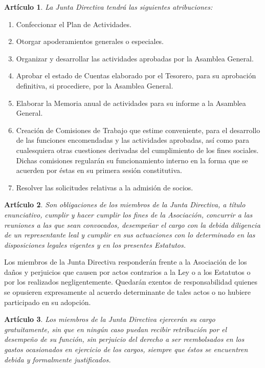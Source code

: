 \documentclass[a4paper,12pt]{article}
\theoremstyle{mystyle}		%
\newtheorem{art}{Artículo}	%
\begin{document}
\begin{onehalfspace}
\begin{art}
La Junta Directiva tendrá las siguientes atribuciones:
\end{art}
\begin{enumerate}[label={\alph*)}]
 \item Confeccionar el Plan de Actividades.
 \item Otorgar apoderamientos generales o especiales.
 \item Organizar y desarrollar las actividades aprobadas por la Asamblea General.
 \item Aprobar el estado de Cuentas elaborado por el Tesorero, para su aprobación definitiva, si procediere, por la Asamblea General.
 \item Elaborar la Memoria anual de actividades para su informe a la Asamblea General.
 \item Creación de Comisiones de Trabajo que estime conveniente, para el desarrollo de las funciones encomendadas y las actividades aprobadas, así como para cualesquiera otras cuestiones derivadas del cumplimiento de los fines sociales. Dichas comisiones regularán su funcionamiento interno en la forma que se acuerden por éstas en su primera sesión constitutiva.
 \item Resolver las solicitudes relativas a la admisión de socios.
\end{enumerate}

\begin{art}
Son obligaciones de los miembros de la Junta Directiva, a título enunciativo, cumplir y hacer cumplir los fines de la Asociación, concurrir a las reuniones a las que sean convocados, desempeñar el cargo con la debida diligencia de un representante leal y cumplir en sus actuaciones con lo determinado en las disposiciones legales vigentes y en los presentes Estatutos.
\end{art}

Los miembros de la Junta Directiva responderán frente a la Asociación de los daños y perjuicios que causen por actos contrarios a la Ley o a los Estatutos o por los realizados negligentemente. Quedarán exentos de responsabilidad quienes se opusieren expresamente al acuerdo determinante de tales actos o no hubiere participado en su adopción.

\begin{art}
Los miembros de la Junta Directiva ejercerán su cargo gratuitamente, sin que en ningún caso puedan recibir retribución por el desempeño de su función, sin perjuicio del derecho a ser reembolsados en los gastos ocasionados en ejercicio de los cargos, siempre que éstos se encuentren debida y formalmente justificados.
\end{art}


\end{onehalfspace}
\end{document}
